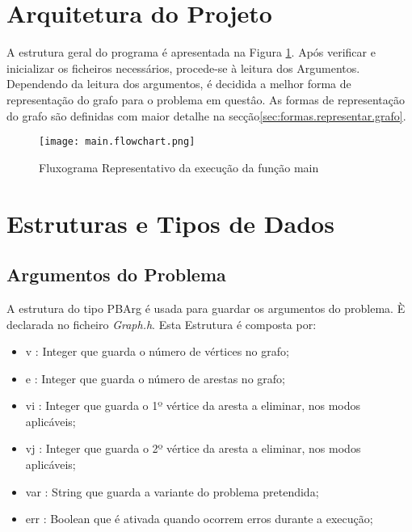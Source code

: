 \documentclass[14pt]{article}
\begin{document}
    \section{Arquitetura do Projeto}\label{arquitetura.projeto}
    A estrutura geral do programa é apresentada na Figura \ref{fig:main.flowchart}.
    Após verificar e inicializar os ficheiros necessários, procede-se à leitura dos Argumentos.
    Dependendo da leitura dos argumentos, é decidida a melhor forma de representação do grafo para o problema
    em questâo.
    As formas de representação do grafo são definidas com maior detalhe na secção\ref{sec:formas.representar.grafo}.

    \begin{figure}[H]
        \centering
        \label{fig:main.flowchart}
        \texttt{[image: main.flowchart.png]}
        \caption{Fluxograma Representativo da execução da função main}
    \end{figure}

    \newpage

    \section{Estruturas e Tipos de Dados}\label{sec:estruturas.tipos.dados}

    \subsection[PBArg]{Argumentos do Problema}\label{subsec:argumentos.problema}
    A estrutura do tipo PBArg é usada para guardar os argumentos do problema. È declarada no ficheiro \emph{Graph.h}.
    Esta Estrutura é composta por:
    \begin{itemize}
        \item v : Integer que guarda o número de vértices no grafo;
        \item e : Integer que guarda o número de arestas no grafo;
        \item vi : Integer que guarda o 1º vértice da aresta a eliminar, nos modos aplicáveis;
        \item vj : Integer que guarda o 2º vértice da aresta a eliminar, nos modos aplicáveis;
        \item var : String que guarda a variante do problema pretendida;
        \item err : Boolean que é ativada quando ocorrem erros durante a execução;
    \end{itemize}
\end{document}
